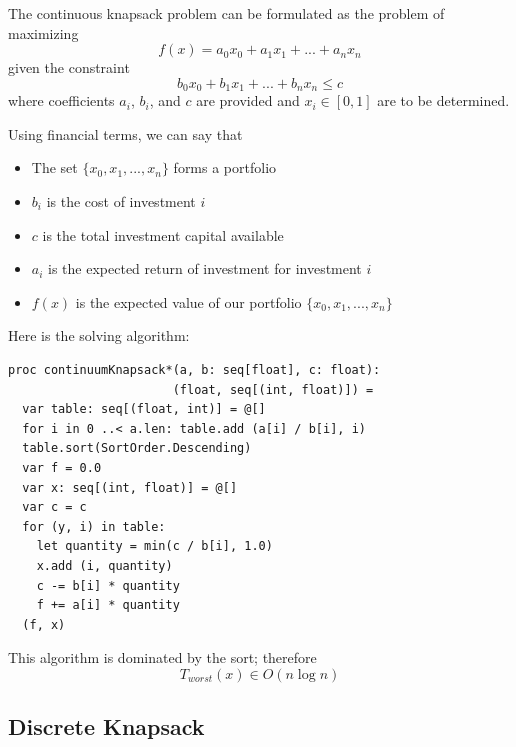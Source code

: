 \documentclass[justified, sixbynine]{tufte-book}
\def\ft{\small\tt}
\theoremstyle{plain}%
\newtheorem * {corollary}{Corollary}
\theoremstyle{definition}
\theoremstyle{remark}
\newtheorem * {remark}{Remark}
\newtheorem * {note}{Note}
\begin{document}
\begin{fullwidth}
The continuous knapsack problem can be formulated as the problem of
maximizing
\begin{equation}
f(x)=a_0x_0+a_1x_1+...+a_nx_n
\end{equation}
given the constraint
\begin{equation}
b_0x_0+b_1x_1+...+b_nx_n\leq c
\end{equation}
where coefficients $a_i$, $b_i$, and $c$ are provided and $x_i\in [0, 1]$ are
to be determined.

Using financial terms, we can say that

\begin{itemize}
\item  The set $\{x_0, x_1, ..., x_n\}$ forms a portfolio

\item  $b_i$ is the cost of investment $i$

\item  $c$ is the total investment capital available

\item  $a_i$ is the expected return of investment for investment $i$

\item  $f(x)$ is the expected value of our portfolio $\{x_0, x_1, ..., x_n\}$
\end{itemize}

Here is the solving algorithm:

\begin{lstlisting}[caption={in file: {\ft nlib.nim}}]
proc continuumKnapsack*(a, b: seq[float], c: float):
                       (float, seq[(int, float)]) =
  var table: seq[(float, int)] = @[]
  for i in 0 ..< a.len: table.add (a[i] / b[i], i)
  table.sort(SortOrder.Descending)
  var f = 0.0
  var x: seq[(int, float)] = @[]
  var c = c
  for (y, i) in table:
    let quantity = min(c / b[i], 1.0)
    x.add (i, quantity)
    c -= b[i] * quantity
    f += a[i] * quantity
  (f, x)
\end{lstlisting}

This algorithm is dominated by the sort; therefore
\begin{equation}
T_{worst}(x)\in O(n\log n)
\end{equation}

\subsection{Discrete Knapsack}


\end{fullwidth}
\end{document}
